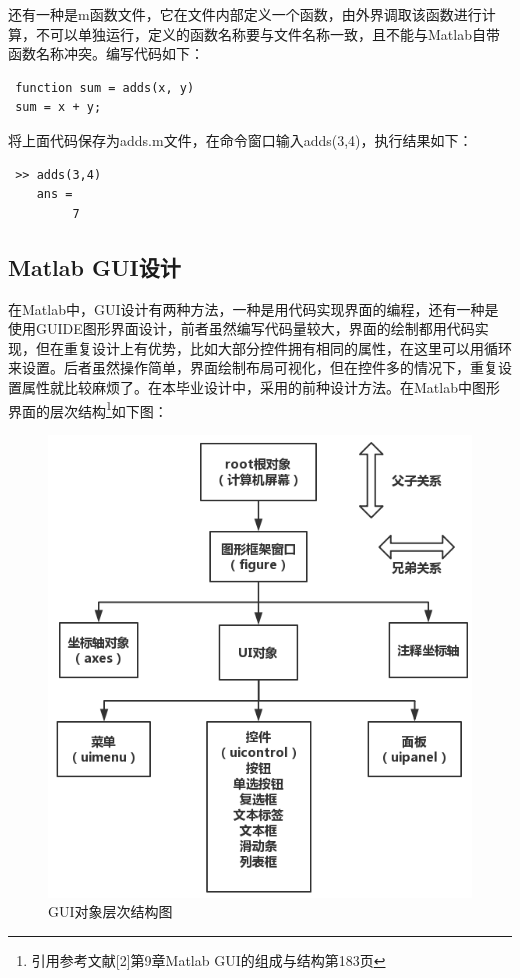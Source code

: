 还有一种是m函数文件，它在文件内部定义一个函数，由外界调取该函数进行计算，不可以单独运行，定义的函数名称要与文件名称一致，且不能与Matlab自带函数名称冲突。编写代码如下：
\begin{lstlisting}
 function sum = adds(x, y)
 sum = x + y;\end{lstlisting}
将上面代码保存为adds.m文件，在命令窗口输入adds(3,4)，执行结果如下：
\begin{lstlisting}
 >> adds(3,4)
 	ans =
		 7\end{lstlisting}
\subsection{Matlab GUI设计}
在Matlab中，GUI设计有两种方法，一种是用代码实现界面的编程，还有一种是使用GUIDE图形界面设计，前者虽然编写代码量较大，界面的绘制都用代码实现，但在重复设计上有优势，比如大部分控件拥有相同的属性，在这里可以用循环来设置。后者虽然操作简单，界面绘制布局可视化，但在控件多的情况下，重复设置属性就比较麻烦了。在本毕业设计中，采用的前种设计方法。在Matlab中图形界面的层次结构\footnote{引用参考文献[2]第9章Matlab GUI的组成与结构第183页}如下图：
\begin{figure}[H]
	\centering
	\includegraphics[scale=0.5]{MatlabGUI}
	\caption{GUI对象层次结构图}
\end{figure}
